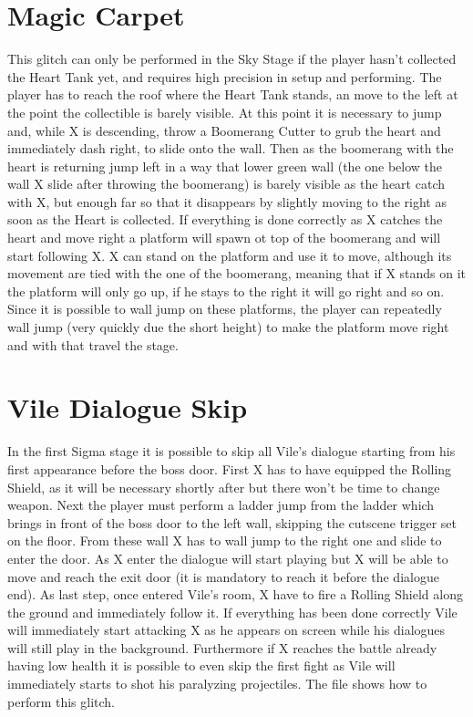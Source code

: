 \section{Magic Carpet}
This glitch can only be performed in the Sky Stage if the player hasn't collected the Heart Tank yet, and requires high precision in setup and performing. The player has to reach the roof where the Heart Tank stands, an move to the left at the point the collectible is barely visible. At this point it is necessary to jump and, while X is descending, throw a Boomerang Cutter to grub the heart and immediately dash right, to slide onto the wall. Then as the boomerang with the heart is returning jump left in a way that lower green wall (the one below the wall X slide after throwing the boomerang) is barely visible as the heart catch with X, but enough far so that it disappears by slightly moving to the right as soon as the Heart is collected. If everything is done correctly as X catches the heart and move right a platform will spawn ot top of the boomerang and will start following X. X can stand on the platform and use it to move, although its movement are tied with the one of the boomerang, meaning that if X stands on it the platform will only go up, if he stays to the right it will go right and so on. Since it is possible to wall jump on these platforms, the player can repeatedly wall jump (very quickly due the short height) to make the platform move right and with that travel the stage.

\section{Vile Dialogue Skip}
In the first Sigma stage it is possible to skip all Vile's dialogue starting from his first appearance before the boss door. First X has to have equipped the Rolling Shield, as it will be necessary shortly after but there won't be time to change weapon. Next the player must perform a ladder jump from the ladder which brings in front of the boss door to the left wall, skipping the cutscene trigger set on the floor. From these wall X has to wall jump to the right one and slide to enter the door. As X enter the dialogue will start playing but X will be able to move and reach the exit door (it is mandatory to reach it before the dialogue end). As last step, once entered Vile's room, X have to fire a Rolling Shield along the ground and immediately follow it. If everything has been done correctly Vile will immediately start attacking X as he appears on screen while his dialogues will still play in the background. Furthermore if X reaches the battle already having low health it is possible to even skip the first fight as Vile will immediately starts to shot his paralyzing projectiles. The file  shows how to perform this glitch.

